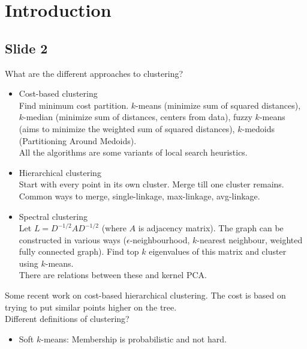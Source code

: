 \documentclass[12pt]{article}
\begin{document}
\section{Introduction}
\subsection*{Slide 2}
What are the different approaches to clustering?
\begin{itemize}
	\item Cost-based clustering\\
	Find minimum cost partition. $k$-means (minimize sum of squared distances), $k$-median (minimize sum of distances, centers from data), fuzzy $k$-means (aims to minimize the weighted sum of squared distances), $k$-medoids (Partitioning Around Medoids). \\
	All the algorithms are some variants of local search heuristics.
	\item Hierarchical clustering\\
	Start with every point in its own cluster. Merge till one cluster remains. Common ways to merge, single-linkage, max-linkage, avg-linkage.
	\item Spectral clustering\\
	Let $L = D^{-1/2} A D^{-1/2}$ (where $A$ is adjacency matrix). The graph can be constructed in various ways ($\epsilon$-neighbourhood, $k$-nearest neighbour, weighted fully connected graph). Find top $k$ eigenvalues of this matrix and cluster using $k$-means.\\
	There are relations between these and kernel PCA.
\end{itemize}
Some recent work on cost-based hierarchical clustering. The cost is based on trying to put similar points higher on the tree.\\

\noindent Different definitions of clustering?
\begin{itemize}
	\item Soft $k$-means: Membership is probabilistic and not hard.
\end{itemize}
\end{document}
